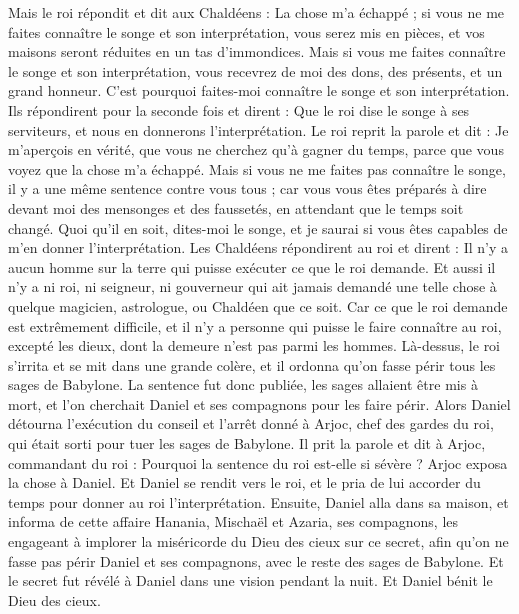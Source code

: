 \begin{multicols}{2}
Mais le roi répondit et dit aux Chaldéens : La chose m’a échappé ; si vous ne me faites connaître le songe et son interprétation, vous serez mis en pièces, et vos maisons seront réduites en un tas d’immondices.
Mais si vous me faites connaître le songe et son interprétation, vous recevrez de moi des dons, des présents, et un grand honneur. C’est pourquoi faites-moi connaître le songe et son interprétation.
Ils répondirent pour la seconde fois et dirent : Que le roi dise le songe à ses serviteurs, et nous en donnerons l'interprétation.
Le roi reprit la parole et dit : Je m’aperçois en vérité, que vous ne cherchez qu'à gagner du temps, parce que vous voyez que la chose m’a échappé.
Mais si vous ne me faites pas connaître le songe, il y a une même sentence contre vous tous ; car vous vous êtes préparés à dire devant moi des mensonges et des faussetés, en attendant que le temps soit changé. Quoi qu'il en soit, dites-moi le songe, et je saurai si vous êtes capables de m’en donner l'interprétation.
Les Chaldéens répondirent au roi et dirent : Il n'y a aucun homme sur la terre qui puisse exécuter ce que le roi demande. Et aussi il n'y a ni roi, ni seigneur, ni gouverneur qui ait jamais demandé une telle chose à quelque magicien, astrologue, ou Chaldéen que ce soit.
Car ce que le roi demande est extrêmement difficile, et il n'y a personne qui puisse le faire connaître au roi, excepté les dieux, dont la demeure n’est pas parmi les hommes.
Là-dessus, le roi s’irrita et se mit dans une grande colère, et il ordonna qu’on fasse périr tous les sages de Babylone.
La sentence fut donc publiée, les sages allaient être mis à mort, et l’on cherchait Daniel et ses compagnons pour les faire périr.
Alors Daniel détourna l'exécution du conseil et l'arrêt donné à Arjoc, chef des gardes du roi, qui était sorti pour tuer les sages de Babylone.
Il prit la parole et dit à Arjoc, commandant du roi : Pourquoi la sentence du roi est-elle si sévère ? Arjoc exposa la chose à Daniel.
Et Daniel se rendit vers le roi, et le pria de lui accorder du temps pour donner au roi l'interprétation.
Ensuite, Daniel alla dans sa maison, et informa de cette affaire Hanania, Mischaël et Azaria, ses compagnons,
les engageant à implorer la miséricorde du Dieu des cieux sur ce secret, afin qu'on ne fasse pas périr Daniel et ses compagnons, avec le reste des sages de Babylone.
Et le secret fut révélé à Daniel dans une vision pendant la nuit. Et Daniel bénit le Dieu des cieux.

\end{multicols}

